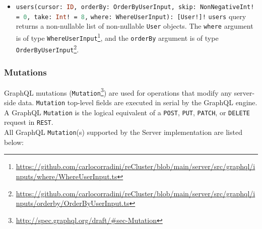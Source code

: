 \begin{itemize}
  \item \lstinline[language=graphql, morekeywords={[2]{User, OrderByUserInput, NonNegativeInt, WhereUserInput}},
    morekeywords={[4]{cursor, orderBy, skip, take, where}}, morekeywords={[5]{users}}]{users(cursor: ID, orderBy: OrderByUserInput, skip: NonNegativeInt! = 0, take: Int! = 8,}
    \newline
    \hphantom{-----------}\lstinline[language=graphql, morekeywords={[2]{User, OrderByUserInput, NonNegativeInt, WhereUserInput}},
    morekeywords={[4]{cursor, orderBy, skip, take, where}}, morekeywords={[5]{users}}]{where: WhereUserInput): [User!]!}
    \newline
    \texttt{users} query returns a non-nullable list of non-nullable \texttt{User}
    objects.
    \newline
    The \texttt{where} argument is of type \texttt{WhereUserInput}\footnote{\url{https://github.com/carlocorradini/reCluster/blob/main/server/src/graphql/inputs/where/WhereUserInput.ts}},
    and the \texttt{orderBy} argument is of type \texttt{OrderByUserInput}\footnote{\url{https://github.com/carlocorradini/reCluster/blob/main/server/src/graphql/inputs/orderby/OrderByUserInput.ts}}.
\end{itemize}

\subsubsection{Mutations}
\label{subsubsec:implementation_server_graphql_api_mutations}

GraphQL mutations (\texttt{Mutation}\footnote{\url{http://spec.graphql.org/draft/\#sec-Mutation}})
are used for operations that modify any server-side data. \texttt{Mutation} top-level
fields are executed in serial by the GraphQL engine. \\ %
A GraphQL \texttt{Mutation} is the logical equivalent of a \texttt{POST},
\texttt{PUT}, \texttt{PATCH}, or \texttt{DELETE} request in \texttt{REST}. \\ %
All GraphQL \texttt{Mutation}(s) supported by the Server implementation are
listed below:

